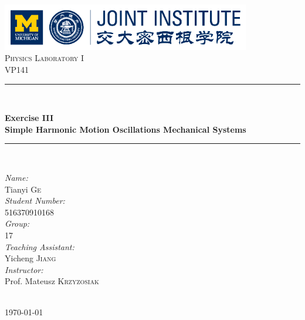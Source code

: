 \begin{titlepage}

\newcommand{\HRule}{\rule{\linewidth}{0.5mm}}

\center

\includegraphics[height=0.8in]{images/logo.png}\\[1cm]

\textsc{\Large Physics Laboratory I}\\[0.4cm]
\textsc{\large VP141}\\[0.4cm]

\HRule \\[0.4cm]
{
    \bfseries
    {\huge Exercise III}\\[0.3cm]
    {\large Simple Harmonic Motion Oscillations Mechanical Systems}\\[0.2cm]
    \HRule \\[1.5cm]
}

\begin{minipage}{0.4\textwidth}

\large
\emph{Name:}\\
Tianyi \textsc{Ge} \\

\emph{Student Number:}\\
516370910168 \\

\emph{Group:}\\
17\\

\emph{Teaching Assistant:}\\
Yicheng \textsc{Jiang}\\

\emph{Instructor:}\\
Prof. Mateusz \textsc{Krzyzosiak}

\end{minipage}\\[2cm]

{\large \today}\\[2cm]

\vfill

\end{titlepage}